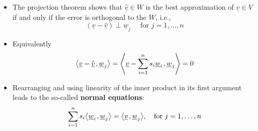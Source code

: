 \documentclass[11pt,twoside]{report}
\newcommand{\vecnot}{\underline}
\newcommand{\inner}[2]{{\left\langle #1 \mskip2mu , #2 \right\rangle}}
\begin{document}
\begin{itemize}
\begin{itemize}
\item The projection theorem shows that $\hat{\vecnot{v}} \in W$ is the best approximation of $\vecnot{v} \in V$ if and only if the error is orthogonal to the $W$, i.e., 
\[
(\vecnot{v} - \hat{\vecnot{v}}) \perp \vecnot{w}_j \quad \text{ for $j=1,\ldots,n$}
\]
\item Equivalently
\begin{equation*}
\inner{ \vecnot{v} - \hat{\vecnot{v}} }{ \vecnot{w}_j }
= \inner{ \vecnot{v} - \sum_{i=1}^n s_i \vecnot{w}_i }{ \vecnot{w}_j }
= 0 \vspace{-1mm}
\end{equation*}
\item Rearranging and using linearity of the inner product in its first argument leads to the so-called  \textbf{normal equations}:
\begin{equation*}
\sum_{i=1}^n s_i \inner{ \vecnot{w}_i }{ \vecnot{w}_j }
= \inner{ \vecnot{v} }{ \vecnot{w}_j }, \quad \text{for $ j=1,\ldots,n$}
\end{equation*}

\end{itemize}



\end{itemize}
\end{document}
